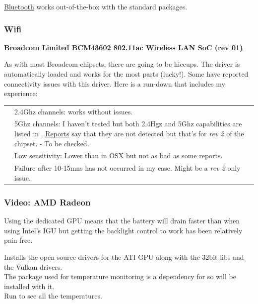 \href{https://wiki.archlinux.org/index.php/Bluetooth}{Bluetooth} works out-of-the-box with the standard packages.


\subsubsection{Wifi}

\textbf{\textcolor{textgrey}{\uline{Broadcom Limited BCM43602 802.11ac Wireless LAN SoC (rev 01)}}}

As with most Broadcom chipsets, there are going to be hiccups. The  driver is automatically loaded and works for the most parts (lucky!). Some have reported connectivity issues with this driver. Here is a run-down that includes my experience:

\vspace*{1em}
\begin{tabularx}{\textwidth}{cX}
	\raisebox{-0.2\height}{\color{green}{\openiconic[]}} & 2.4Ghz channels: works without issues.\\
	\raisebox{-0.2\height}{\color{orange}{\openiconic[]}} & 5Ghz channels: I haven't tested but both 2.4Hgz and 5Ghz capabilities are listed in \code{iw list}. \href{https://bugzilla.kernel.org/show_bug.cgi?id=193121}{Reports} say that they are not detected but that's for \textit{rev 2} of the chipset. - To be checked.\\
	\raisebox{-0.2\height}{\color{orange}{\openiconic[]}} & Low sensitivity: Lower than in OSX but not as bad as some reports.\\
	\raisebox{-0.2\height}{\color{green}{\openiconic[]}} & Failure after 10-15mns has not occurred in my case. Might be a \textit{rev 2} only issue.
\end{tabularx}

\subsubsection{Video: AMD Radeon}

Using the dedicated GPU means that the battery will drain faster than when using Intel's IGU but getting the backlight control to work has been relatively pain free.

\begin{blocksection}
	Installs the open source drivers for the ATI GPU along with the 32bit libs and the Vulkan drivers.\\
	The \href{https://wiki.archlinux.org/index.php/Lm_sensors}{} package used for temperature monitoring is a dependency for  so will be installed with it.\\
	Run  to see all the temperatures.
\end{blocksection}

